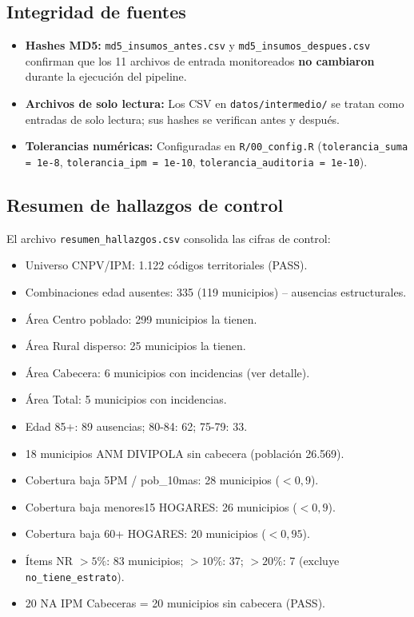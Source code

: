 \subsection{Integridad de fuentes}
\label{sec:integridad_fuentes}

\begin{itemize}
    \item \textbf{Hashes MD5:} \texttt{md5\_insumos\_antes.csv} y \texttt{md5\_insumos\_despues.csv} confirman que los 11 archivos de entrada monitoreados \textbf{no cambiaron} durante la ejecución del pipeline.
    \item \textbf{Archivos de solo lectura:} Los CSV en \texttt{datos/intermedio/} se tratan como entradas de solo lectura; sus hashes se verifican antes y después.
    \item \textbf{Tolerancias numéricas:} Configuradas en \texttt{R/00\_config.R} (\texttt{tolerancia\_suma = 1e-8}, \texttt{tolerancia\_ipm = 1e-10}, \texttt{tolerancia\_auditoria = 1e-10}).
\end{itemize}

\subsection{Resumen de hallazgos de control}
\label{sec:resumen_hallazgos}

El archivo \texttt{resumen\_hallazgos.csv} consolida las cifras de control:

\begin{itemize}
    \item Universo CNPV/IPM: 1.122 códigos territoriales (PASS).
    \item Combinaciones edad ausentes: 335 (119 municipios) -- ausencias estructurales.
    \item Área Centro poblado: 299 municipios la tienen.
    \item Área Rural disperso: 25 municipios la tienen.
    \item Área Cabecera: 6 municipios con incidencias (ver detalle).
    \item Área Total: 5 municipios con incidencias.
    \item Edad 85+: 89 ausencias; 80-84: 62; 75-79: 33.
    \item 18 municipios ANM DIVIPOLA sin cabecera (población 26.569).
    \item Cobertura baja 5PM / pob\_10mas: 28 municipios ($<0,9$).
    \item Cobertura baja menores15 HOGARES: 26 municipios ($<0,9$).
    \item Cobertura baja 60+ HOGARES: 20 municipios ($<0,95$).
    \item Ítems NR $>5\%$: 83 municipios; $>10\%$: 37; $>20\%$: 7 (excluye \texttt{no\_tiene\_estrato}).
    \item 20 NA IPM Cabeceras = 20 municipios sin cabecera (PASS).
\end{itemize}

